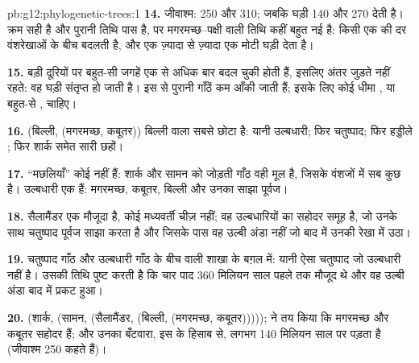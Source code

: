 \begin{solution}{pb:g12:phylogenetic-trees:1}
\textbf{14.} जीवाश्म: 250 और 310; जबकि घड़ी 140 और 270 देती है। क्रम सही है
और पुरानी तिथि पास है, पर मगरमच्छ--पक्षी वाली तिथि कहीं बहुत नई है: किसी
एक  की दर वंशरेखाओं के बीच बदलती है, और एक  ज़्यादा से ज़्यादा एक
मोटी घड़ी देता है।

\textbf{15.} बड़ी दूरियों पर बहुत-सी जगहें एक से अधिक बार बदल चुकी होती हैं,
इसलिए अंतर जुड़ते नहीं रहते: वह घड़ी संतृप्त हो जाती है। इस  से पुरानी
गाँठें कम आँकी जाती हैं; इसके लिए कोई धीमा , या बहुत-से , चाहिए।

\textbf{16.} (बिल्ली, (मगरमच्छ, कबूतर)) बिल्ली वाला सबसे छोटा  है:
यानी उल्बधारी; फिर चतुष्पाद; फिर हड्डीले ; फिर शार्क समेत सारी छहों।

\textbf{17.} ``मछलियाँ'' कोई  नहीं हैं: शार्क और सामन को जोड़ती गाँठ
वही मूल है, जिसके वंशजों में सब कुछ है। उल्बधारी एक  हैं: मगरमच्छ,
कबूतर, बिल्ली और उनका साझा पूर्वज।

\textbf{18.} सैलामैंडर एक मौजूदा  है, कोई मध्यवर्ती चीज़ नहीं; वह
उल्बधारियों का सहोदर समूह है, जो उनके साथ चतुष्पाद पूर्वज साझा करता है और
जिसके पास वह उल्बी अंडा नहीं जो बाद में उनकी रेखा में उठा।

\textbf{19.} चतुष्पाद गाँठ और उल्बधारी गाँठ के बीच वाली शाखा के बग़ल में:
यानी ऐसा चतुष्पाद जो उल्बधारी नहीं है। उसकी तिथि पुष्ट करती है कि चार पाद
360 मिलियन साल पहले तक मौजूद थे और वह उल्बी अंडा बाद में प्रकट हुआ।

\textbf{20.} (शार्क, (सामन, (सैलामैंडर, (बिल्ली, (मगरमच्छ,
कबूतर)))));  ने तय किया कि मगरमच्छ और कबूतर सहोदर हैं; और उनका बँटवारा,
इस  के हिसाब से, लगभग 140 मिलियन साल पर पड़ता है (जीवाश्म 250 कहते हैं)।
\end{solution}
